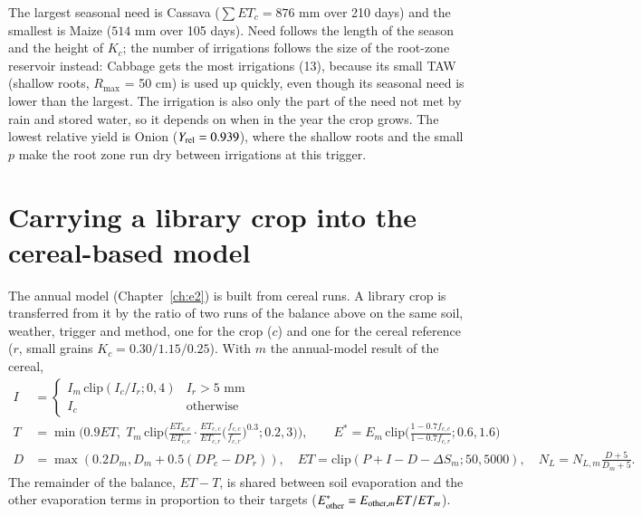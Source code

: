 \sol  The largest seasonal need is Cassava ($\sum ET_c=876$ mm over 210 days) and the smallest is Maize ($514$ mm over 105 days). Need follows the length of the season and the height of $K_c$; the number of irrigations follows the size of the root-zone reservoir instead: Cabbage gets the most irrigations (13), because its small TAW (shallow roots, $R_{\max}$ = 50 cm) is used up quickly, even though its seasonal need is lower than the largest. The irrigation is also only the part of the need not met by rain and stored water, so it depends on when in the year the crop grows. The lowest relative yield is Onion ($Y_{\rm rel}=0.939$), where the shallow roots and the small $p$ make the root zone run dry between irrigations at this trigger. \finans


\section{Carrying a library crop into the cereal-based model}
The annual model (Chapter~\ref{ch:e2}) is built from cereal runs. A library crop is transferred from it by the ratio of two runs of the balance above on the same soil, weather, trigger and method, one for the crop ($c$) and one for the cereal reference ($r$, small grains $K_c=0.30/1.15/0.25$). With $m$ the annual-model result of the cereal,
\begin{align}I&=\begin{cases}I_m\,\mathrm{clip}(I_c/I_r;0,4)&I_r>5\text{ mm}\\I_c&\text{otherwise}\end{cases}\\
T&=\min\Big(0.9ET,\;T_m\,\mathrm{clip}\Big(\frac{ET_{a,c}}{ET_{c,c}}\cdot\frac{ET_{c,c}}{ET_{c,r}}\Big(\frac{f_{c,c}}{f_{c,r}}\Big)^{0.3};0.2,3\Big)\Big),\qquad E^*=E_m\,\mathrm{clip}\Big(\frac{1-0.7f_{c,c}}{1-0.7f_{c,r}};0.6,1.6\Big)\\
D&=\max(0.2D_m,D_m+0.5(DP_c-DP_r)),\quad ET=\mathrm{clip}(P+I-D-\Delta S_m;50,5000),\quad N_L=N_{L,m}\frac{D+5}{D_m+5}.\end{align}
The remainder of the balance, $ET-T$, is shared between soil evaporation and the other evaporation terms in proportion to their targets ($E_{\rm other}^*=E_{{\rm other},m}ET/ET_m$).

